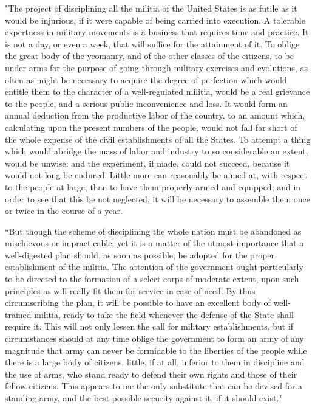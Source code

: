 "The project of disciplining all the militia of the United States is as futile as it would be injurious, if it were capable of being carried into execution. 
A tolerable expertness in military movements is a business that requires time and practice. 
It is not a day, or even a week, that will suffice for the attainment of it. 
To oblige the great body of the yeomanry, and of the other classes of the citizens, to be under arms for the purpose of going through military exercises and evolutions, as often as might be necessary to acquire the degree of perfection which would entitle them to the character of a well-regulated militia, would be a real grievance to the people, and a serious public inconvenience and loss. 
It would form an annual deduction from the productive labor of the country, to an amount which, calculating upon the present numbers of the people, would not fall far short of the whole expense of the civil establishments of all the States. 
To attempt a thing which would abridge the mass of labor and industry to so considerable an extent, would be unwise: and the experiment, if made, could not succeed, because it would not long be endured. 
Little more can reasonably be aimed at, with respect to the people at large, than to have them properly armed and equipped; and in order to see that this be not neglected, it will be necessary to assemble them once or twice in the course of a year.

``But though the scheme of disciplining the whole nation must be abandoned as mischievous or impracticable; yet it is a matter of the utmost importance that a well-digested plan should, as soon as possible, be adopted for the proper establishment of the militia. 
The attention of the government ought particularly to be directed to the formation of a select corps of moderate extent, upon such principles as will really fit them for service in case of need. 
By thus circumscribing the plan, it will be possible to have an excellent body of well-trained militia, ready to take the field whenever the defense of the State shall require it. 
This will not only lessen the call for military establishments, but if circumstances should at any time oblige the government to form an army of any magnitude that army can never be formidable to the liberties of the people while there is a large body of citizens, little, if at all, inferior to them in discipline and the use of arms, who stand ready to defend their own rights and those of their fellow-citizens. 
This appears to me the only substitute that can be devised for a standing army, and the best possible security against it, if it should exist."

